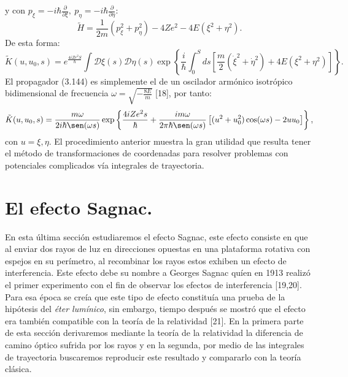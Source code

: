y con $	p_{\xi}=-i\hbar\frac{\partial}{\partial\xi},\ p_{\eta}=-i\hbar\frac{\partial}{\partial\eta} $:
\begin{equation}
\tilde{H}=\frac{1}{2m}\left(p_{\xi}^{2}+p_{\eta}^{2}\right)-4Ze^{2}-4E(\xi^{2}+\eta^{2}).
\end{equation}
De esta forma:
\begin{equation}
\tilde{K}(u,u_{0},s)=e^{\frac{4iZe^{2}S}{\hbar}}\int\mathcal{D}\xi(s)\mathcal{D}\eta(s)\exp\left\{ \frac{i}{\hbar}\int_{0}^{S}ds\left[\frac{m}{2}(\dot{\xi}^{2}+\dot{\eta}^{2})+4E(\xi^{2}+\eta^{2})\right]\right\} .
\end{equation} 
El propagador (3.144) es simplemente el de un oscilador armónico isotrópico bidimensional de frecuencia $\omega=\sqrt{-\frac{8E}{m}}$ [18], por tanto:
\begin{equation}
\tilde{K}(u,u_{0},s)=\frac{m\omega}{2i\hbar\sen(\omega s)}\exp\left\{ \frac{4iZe^{2}s}{\hbar}+\frac{im\omega}{2\pi\hbar\sen(\omega s)}\left[(u^{2}+u_{0}^{2})\cos(\omega s)-2uu_{0}\right]\right\}, 
\end{equation}
con $u={\xi ,\eta}$. El procedimiento anterior muestra la gran utilidad que resulta tener el método de transformaciones de coordenadas para resolver problemas con potenciales complicados vía integrales de trayectoria.
\newpage






\section{El efecto Sagnac.}
En esta última sección estudiaremos el efecto Sagnac, este efecto consiste en que al enviar dos rayos de luz en  direcciones opuestas en una plataforma rotativa con espejos en su perímetro, al recombinar los rayos estos exhiben un efecto de interferencia. Este efecto debe su nombre a Georges Sagnac quíen en 1913 realizó el primer experimento con el fin de observar los efectos de interferencia [19,20]. Para esa época se creía que este tipo de efecto constituía una prueba de la hipótesis del \textit{éter lumínico}, sin embargo, tiempo después se mostró que el efecto era también compatible con la teoría de la relatividad [21]. En la primera parte de esta sección derivaremos mediante la teoría de la relatividad la diferencia de camino óptico sufrida por los rayos y en la segunda, por medio de las integrales de trayectoria buscaremos reproducir este resultado y compararlo con la teoría clásica.
	 
